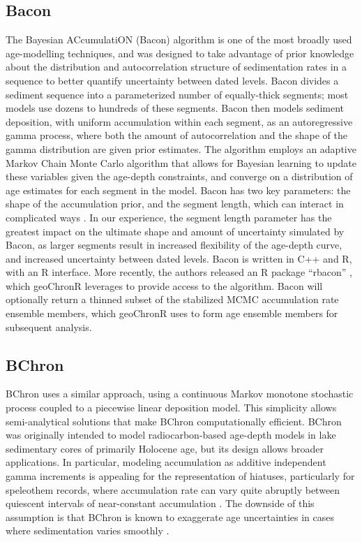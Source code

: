 \documentclass[gchron, manuscript]{copernicus}
\begin{document}
\subsection{Bacon}

The Bayesian ACcumulatiON (Bacon) algorithm \citep{Blaauw2011BACON} is one of the most broadly used age-modelling techniques, and was designed to take advantage of prior knowledge about the distribution and autocorrelation structure of sedimentation rates in a sequence to better quantify uncertainty between dated levels.
Bacon divides a sediment sequence into a parameterized number of equally-thick segments; most models use dozens to hundreds of these segments.
Bacon then models sediment deposition, with uniform accumulation within each segment, as an autoregressive gamma process, where both the amount of autocorrelation and the shape of the gamma distribution are given prior estimates.
The algorithm employs an adaptive Markov Chain Monte Carlo algorithm that allows for Bayesian learning to update these variables given the age-depth constraints, and converge on a distribution of age estimates for each segment in the model.
Bacon has two key parameters: the shape of the accumulation prior, and the segment length, which can interact in complicated ways \citep{trachsel2017}.
In our experience, the segment length parameter has the greatest impact on the ultimate shape and amount of uncertainty simulated by Bacon, as larger segments result in increased flexibility of the age-depth curve, and increased uncertainty between dated levels.
Bacon is written in C++ and R, with an R interface.
More recently, the authors released an R package ``rbacon'' \citep{baconPackage}, which geoChronR leverages to provide access to the algorithm.
Bacon will optionally return a thinned subset of the stabilized MCMC accumulation rate ensemble members, which geoChronR uses to form age ensemble members for subsequent analysis.

\subsection{BChron}

BChron \citep{bchron, parnell2008flexible} uses a similar approach, using a continuous Markov monotone stochastic process coupled to a piecewise linear deposition model.
This simplicity allows semi-analytical solutions that make BChron computationally efficient. BChron was originally intended to model radiocarbon-based age-depth models in lake sedimentary cores of primarily Holocene age, but its design allows broader applications.
In particular, modeling accumulation as additive independent gamma increments is appealing for the representation of hiatuses, particularly for speleothem records, where accumulation rate can vary quite abruptly between quiescent intervals of near-constant accumulation \citep{Parnell_QSR2011, PRYSM, Hu_epsl17}.
The downside of this assumption is that BChron is known to exaggerate age uncertainties in cases where sedimentation varies smoothly \citep{trachsel2017}.
\end{document}

